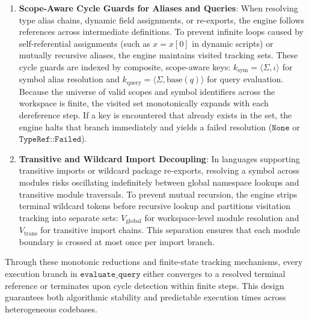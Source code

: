 \begin{enumerate}
  \item \textbf{Scope-Aware Cycle Guards for Aliases and Queries}:
    When resolving
    type alias chains, dynamic field assignments, or re-exports, the engine
    follows references across intermediate definitions. To prevent
    infinite loops
    caused by self-referential assignments (such as $x = x[0]$ in
    dynamic scripts)
    or mutually recursive aliases, the engine maintains visited tracking sets.
    These cycle guards are indexed by composite, scope-aware keys:
    $k_{\text{sym}} =
    \langle \Sigma, \iota \rangle$ for symbol alias resolution and
    $k_{\text{query}} =
    \langle \Sigma, \text{base}(q) \rangle$ for query evaluation. Because the
    universe of valid scopes and symbol identifiers across the
    workspace is finite,
    the visited set monotonically expands with each dereference step.
    If a key is
    encountered that already exists in the set, the engine halts that branch
    immediately and yields a failed resolution ($\texttt{None}$ or
    $\texttt{TypeRef::Failed}$).

  \item \textbf{Transitive and Wildcard Import Decoupling}: In
    languages supporting
    transitive imports or wildcard package re-exports, resolving a symbol across
    modules risks oscillating indefinitely between global namespace lookups and
    transitive module traversals. To prevent mutual recursion, the engine strips
    terminal wildcard tokens before recursive lookup and partitions visitation
    tracking into separate sets: $V_{\text{global}}$ for workspace-level module
    resolution and $V_{\text{trans}}$ for transitive import chains.
    This separation
    ensures that each module boundary is crossed at most once per import branch.
\end{enumerate}

Through these monotonic reductions and finite-state tracking mechanisms, every
execution branch in $\texttt{evaluate\_query}$ either converges to a resolved
terminal reference or terminates upon cycle detection within finite steps.
This design guarantees both algorithmic stability and predictable execution
times across heterogeneous codebases.
